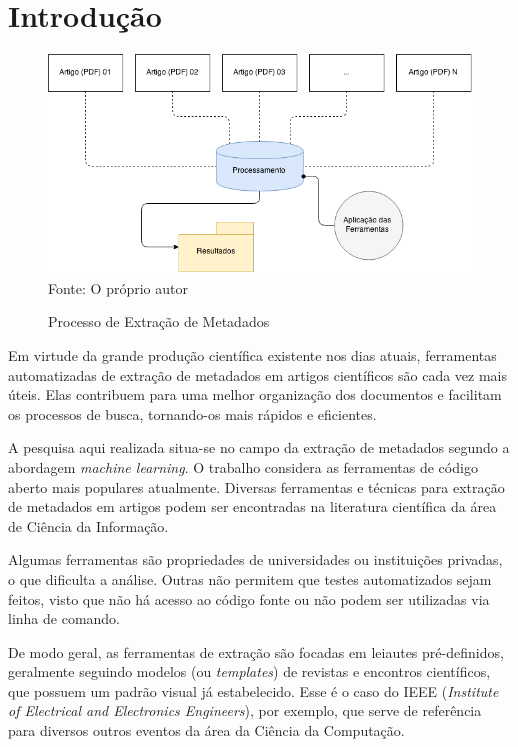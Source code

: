 
\chapter{Introdução}
\label{cha:introduction}


\begin{figure}
    \centering
    \caption{Processo de Extração de Metadados}
    \label{fig:introduction}
    \includegraphics[width=0.9\linewidth]{./assets/images/introduction}
    \center\footnotesize{Fonte: O próprio autor}
\end{figure}


Em virtude da grande produção científica existente nos dias atuais, ferramentas automatizadas de extração de metadados em artigos científicos são cada vez mais úteis. Elas contribuem para uma melhor organização dos documentos e facilitam os processos de busca, tornando-os mais rápidos e eficientes.

A pesquisa aqui realizada situa-se no campo da extração de metadados segundo a abordagem \textit{machine learning}. O trabalho considera as ferramentas de código aberto mais populares atualmente. Diversas ferramentas e técnicas para extração de metadados em artigos podem ser encontradas na literatura científica da área de Ciência da Informação. 

Algumas ferramentas são propriedades de universidades ou instituições privadas, o que dificulta a análise. Outras não permitem que testes automatizados sejam feitos, visto que não há acesso ao código fonte ou não podem ser utilizadas via linha de comando.

De modo geral, as ferramentas de extração são focadas em leiautes pré-definidos, geralmente seguindo modelos (ou \textit{templates}) de revistas e encontros científicos, que possuem um padrão visual já estabelecido. Esse é o caso do IEEE (\textit{Institute of Electrical and Electronics Engineers}), por exemplo, que serve de referência para diversos outros eventos da área da Ciência da Computação. 

